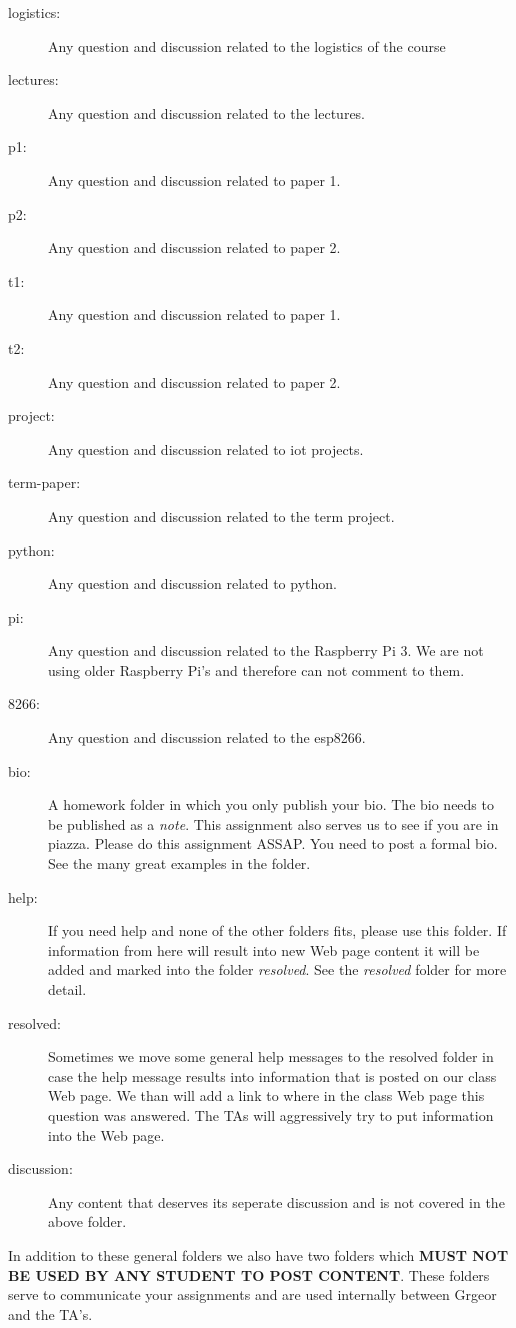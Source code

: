 \begin{description}
\item[logistics:]
Any question and discussion related to the logistics of the course
\item[lectures:]
Any question and discussion related to the lectures.
\item[p1:]
Any question and discussion related to paper 1.
\item[p2:]
Any question and discussion related to paper 2.
\item[t1:]
Any question and discussion related to paper 1.
\item[t2:]
Any question and discussion related to paper 2.
\item[project:]
Any question and discussion related to iot projects.
\item[term-paper:]
Any question and discussion related to the term project.
\item[python:]
Any question and discussion related to python.
\item[pi:]
Any question and discussion related to the Raspberry Pi 3. We are not
using older Raspberry Pi's and therefore can not comment to them.
\item[8266:]
Any question and discussion related to the esp8266.
\item[bio:]
A homework folder in which you only publish your bio. The bio needs to
be published as a \emph{note}. This assignment also serves us to see if
you are in piazza. Please do this assignment ASSAP. You need to post a
formal bio. See the many great examples in the folder.
\item[help:]
If you need help and none of the other folders fits, please use this
folder. If information from here will result into new Web page content
it will be added and marked into the folder \emph{resolved}. See the
\emph{resolved} folder for more detail.
\item[resolved:]
Sometimes we move some general help messages to the resolved folder in
case the help message results into information that is posted on our
class Web page. We than will add a link to where in the class Web page
this question was answered. The TAs will aggressively try to put
information into the Web page.
\item[discussion:]
Any content that deserves its seperate discussion and is not covered in
the above folder.
\end{description}

In addition to these general folders we also have two folders which
\textbf{MUST NOT BE USED BY ANY STUDENT TO POST CONTENT}. These folders
serve to communicate your assignments and are used internally between
Grgeor and the TA's.

